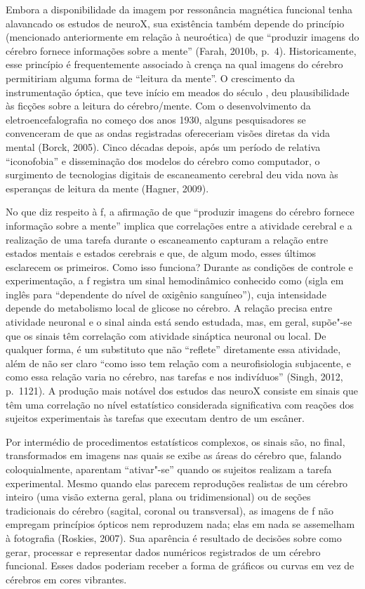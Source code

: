 Embora a disponibilidade da imagem por ressonância magnética funcional
tenha alavancado os estudos de neuroX, sua existência também depende do
princípio (mencionado anteriormente em relação à neuroética) de que
``produzir imagens do cérebro fornece informações sobre a mente'' (Farah,
2010b, p.~4). Historicamente, esse princípio é frequentemente associado à
crença na qual imagens do cérebro permitiriam alguma forma de ``leitura
da mente''. O crescimento da instrumentação óptica, que teve início em
meados do século , deu plausibilidade às ficções sobre a leitura do
cérebro/mente. Com o desenvolvimento da eletroencefalografia no começo
dos anos 1930, alguns pesquisadores se convenceram de que as ondas
registradas ofereceriam visões diretas da vida mental (Borck, 2005).
Cinco décadas depois, após um período de relativa ``iconofobia'' e
disseminação dos modelos do cérebro como computador, o surgimento de
tecnologias digitais de escaneamento cerebral deu vida nova às
esperanças de leitura da mente (Hagner, 2009).

No que diz respeito à f, a afirmação de que ``produzir imagens do
cérebro fornece informação sobre a mente'' implica que correlações entre a
atividade cerebral e a realização de uma tarefa durante o escaneamento
capturam a relação entre estados mentais e estados cerebrais e que, de
algum modo, esses últimos esclarecem os primeiros. Como isso funciona?
Durante as condições de controle e experimentação, a f registra um
sinal hemodinâmico conhecido como  (sigla em inglês para ``dependente
do nível de oxigênio sanguíneo''), cuja intensidade depende do metabolismo
local de glicose no cérebro. A relação precisa entre atividade neuronal e o sinal
 ainda está sendo estudada, mas, em geral, supõe"-se que os sinais
têm correlação com atividade sináptica neuronal ou local. De qualquer
forma, é um substituto que não ``reflete'' diretamente essa atividade,
além de não ser claro ``como isso tem relação com a neurofisiologia
subjacente, e como essa relação varia no cérebro, nas tarefas e nos
indivíduos'' (Singh, 2012, p.~1121). A produção mais notável dos estudos
das neuroX consiste em sinais  que têm uma correlação no nível
estatístico considerada significativa com reações dos sujeitos experimentais às tarefas que executam dentro de um escâner.

Por intermédio de procedimentos estatísticos complexos, os sinais são,
no final, transformados em imagens nas quais se exibe as
áreas do cérebro que, falando coloquialmente, aparentam ``ativar"-se''
quando os sujeitos realizam a tarefa experimental. Mesmo quando elas
parecem reproduções realistas de um cérebro inteiro (uma visão externa
geral, plana ou tridimensional) ou de seções tradicionais do cérebro
(sagital, coronal ou transversal), as imagens de f não empregam
princípios ópticos nem reproduzem nada; elas em nada se assemelham à
fotografia (Roskies, 2007). Sua aparência é resultado de decisões sobre
como gerar, processar e representar dados numéricos registrados de um
cérebro funcional. Esses dados poderiam receber a forma de gráficos ou
curvas em vez de cérebros em cores vibrantes.


